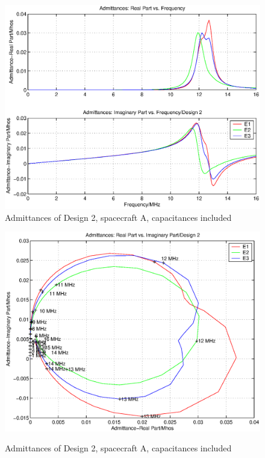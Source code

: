 \documentclass[a4paper,14pt]{extbook}
\begin{document}
\begin{figure}
\begin{center}
\includegraphics[scale=0.65]{AdmittancesD21_caps.eps}\\
\caption{Admittances of Design 2, spacecraft A, capacitances included} \label{fig_Admittance1_D2_caps}
\includegraphics[scale=0.65]{AdmittancesD22_caps.eps} \\
\caption{Admittances of Design 2, spacecraft A, capacitances included} \label{fig_Admittance2_D2_caps}
\end{center}
\end{figure}
\end{document}

